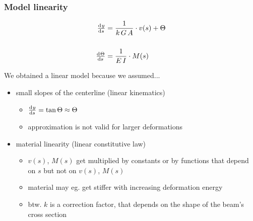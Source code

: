 \begin{frame}
  \frametitle{Model linearity}
  
  \begin{displaymath}
    \begin{alignedat}{1}
      \od{y}{s} &= \frac{1}{k \, G \, A} \cdot v(s) + \Theta  \\ \\
      \od{\Theta}{s} &= \frac{1}{E \, I} \cdot M(s)
    \end{alignedat}
  \end{displaymath}

  \vspace{1em}
  We obtained a linear model because we assumed...
  \begin{itemize}
    \item small slopes of the centerline (linear kinematics)
      \begin{itemize}
        \item $\od{y}{s} = \tan{\Theta} \approx \Theta$
        \item approximation is not valid for larger deformations
      \end{itemize} 
    \item material linearity (linear constitutive law)
      \begin{itemize}
        \item $v(s)$, $M(s)$ get multiplied by constants \newline
          or by functions that depend on $s$ but not on $v(s)$, $M(s)$
        \item material may eg. get stiffer with increasing deformation energy
        \item btw. $k$ is a correction factor, that depends on the shape of the beam's cross section
      \end{itemize}
  \end{itemize}
\end{frame}

